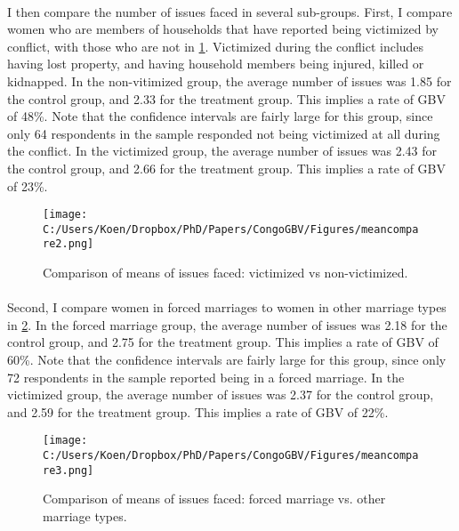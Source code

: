 \documentclass[11pt,a4paper]{scrartcl} %
\begin{document}
\paragraph{}
I then compare the number of issues faced in several sub-groups. First, I compare women who are members of households that have reported being victimized by conflict, with those who are not in \ref{fig:meancompare2}. Victimized during the conflict includes having lost property, and having household members being injured, killed or kidnapped. In the non-vitimized group, the average number of issues was 1.85 for the control group, and 2.33 for the treatment group. This implies a rate of GBV of 48\%. Note that the confidence intervals are fairly large for this group, since only 64 respondents in the sample responded not being victimized at all during the conflict. In the victimized group, the average number of issues was 2.43 for the control group, and 2.66 for the treatment group. This implies a rate of GBV of 23\%. 

\begin{figure}
  \texttt{[image: C:/Users/Koen/Dropbox/PhD/Papers/CongoGBV/Figures/meancompare2.png]}
  \caption{Comparison of means of issues faced: victimized vs non-victimized.}
  \label{fig:meancompare2}
\end{figure}

\paragraph{}
Second, I compare women in forced marriages to women in other marriage types in \ref{fig:meancompare3}. In the forced marriage group, the average number of issues was 2.18 for the control group, and 2.75 for the treatment group. This implies a rate of GBV of 60\%. Note that the confidence intervals are fairly large for this group, since only 72 respondents in the sample reported being in a forced marriage. In the victimized group, the average number of issues was 2.37 for the control group, and 2.59 for the treatment group. This implies a rate of GBV of 22\%. 

\begin{figure}
  \texttt{[image: C:/Users/Koen/Dropbox/PhD/Papers/CongoGBV/Figures/meancompare3.png]}
  \caption{Comparison of means of issues faced: forced marriage vs. other marriage types.}
  \label{fig:meancompare3}
\end{figure}
\end{document}
